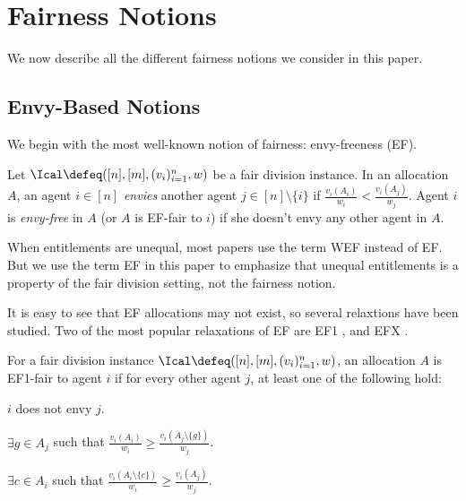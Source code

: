 \section{Fairness Notions}
\label{sec:notions}

We now describe all the different fairness notions we consider in this paper.

\subsection{Envy-Based Notions}

We begin with the most well-known notion of fairness: envy-freeness (EF).

\begin{definition}[EF]
\label{defn:ef}
Let $\Ical \defeq ([n], [m], (v_i)_{i=1}^n, w)$ be a fair division instance.
In an allocation $A$, an agent $i \in [n]$ \emph{envies} another agent $j \in [n] \setminus \{i\}$ if
$\frac{v_i(A_i)}{w_i} < \frac{v_i(A_j)}{w_j}$.
Agent $i$ is \emph{envy-free} in $A$ (or $A$ is EF-fair to $i$) if
she doesn't envy any other agent in $A$.
\end{definition}

When entitlements are unequal, most papers use the term WEF instead of EF.
But we use the term EF in this paper to emphasize that unequal entitlements
is a property of the fair division setting, not the fairness notion.

It is easy to see that EF allocations may not exist, so several relaxtions have been studied.
Two of the most popular relaxations of EF are
EF1 \cite{budish2011combinatorial,lipton2004approximately},
and EFX \cite{caragiannis2019unreasonable}.

\begin{definition}
\label{defn:ef1}
For a fair division instance $\Ical \defeq ([n], [m], (v_i)_{i=1}^n, w)$,
an allocation $A$ is EF1-fair to agent $i$ if for every other agent $j$,
at least one of the following hold:
\begin{tightenum}
\item $i$ does not envy $j$.
\item $\exists g \in A_j$ such that
    $\displaystyle \frac{v_i(A_i)}{w_i} \ge \frac{v_i(A_j \setminus \{g\})}{w_j}$.
\item $\exists c \in A_i$ such that
    $\displaystyle \frac{v_i(A_i \setminus \{c\})}{w_i} \ge \frac{v_i(A_j)}{w_j}$.
\end{tightenum}
\end{definition}

